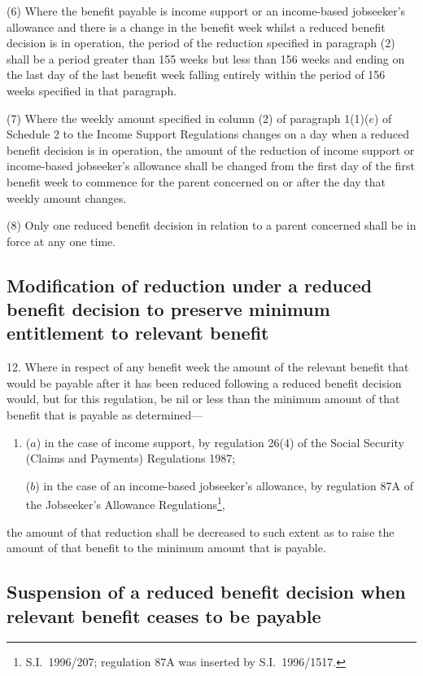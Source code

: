 \documentclass[12pt,a4paper]{article}
\begin{document}
(6) Where the benefit payable is income support or an income-based jobseeker’s allowance and there is a change in the benefit week whilst a reduced benefit decision is in operation, the period of the reduction specified in paragraph (2) shall be a period greater than 155 weeks but less than 156 weeks and ending on the last day of the last benefit week falling entirely within the period of 156 weeks specified in that paragraph.

(7) Where the weekly amount specified in column (2) of paragraph 1(1)($e$)  of Schedule 2 to the Income Support Regulations changes on a day when a reduced benefit decision is in operation, the amount of the reduction of income support or income-based jobseeker’s allowance shall be changed from the first day of the first benefit week to commence for the parent concerned on or after the day that weekly amount changes.

(8) Only one reduced benefit decision in relation to a parent concerned shall be in force at any one time.

\subsection[12. Modification of reduction under a reduced benefit decision to preserve minimum entitlement to relevant benefit]{Modification of reduction under a reduced benefit decision to preserve minimum entitlement to relevant benefit}

12.  Where in respect of any benefit week the amount of the relevant benefit that would be payable after it has been reduced following a reduced benefit decision would, but for this regulation, be nil or less than the minimum amount of that benefit that is payable as determined—
\begin{enumerate}\item[]
($a$) in the case of income support, by regulation 26(4) of the Social Security (Claims and Payments) Regulations 1987;

($b$) in the case of an income-based jobseeker’s allowance, by regulation 87A of the Jobseeker’s Allowance Regulations\footnote{S.I.\ 1996/207; regulation 87A was inserted by S.I.\ 1996/1517.},
\end{enumerate}
the amount of that reduction shall be decreased to such extent as to raise the amount of that benefit to the minimum amount that is payable.

\subsection[13. Suspension of a reduced benefit decision when relevant benefit ceases to be payable]{Suspension of a reduced benefit decision when relevant benefit ceases to be payable}
\end{document}
